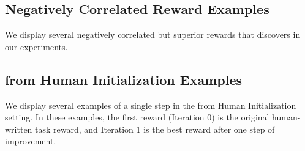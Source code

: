 \renewcommand\lstlistingname{Example}
\setcounter{lstlisting}{0}




\subsection{Negatively Correlated \ourmethod Reward Examples}
\label{appendix:negative-correlated-examples}
We display several negatively correlated but superior rewards that \ourmethod discovers in our experiments. 
\renewcommand\lstlistingname{Example}
\setcounter{lstlisting}{0}



\subsection{\ourmethod from Human Initialization Examples}
\label{appendix:human-initialization-examples}
We display several examples of a single step in the \ourmethod from Human Initialization setting. In these examples, the first reward (Iteration 0) is the original human-written task reward, and Iteration 1 is the best reward after one step of \ourmethod improvement. 
\renewcommand\lstlistingname{Example}
\setcounter{lstlisting}{0}




